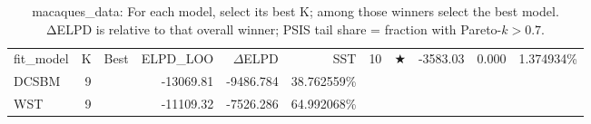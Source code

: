 \begin{table}[!h]
\centering
\caption{macaques_data: For each model, select its best K; among those winners select the best model. ΔELPD is relative to that overall winner; PSIS tail share = fraction with Pareto-\(k>0.7\).\\\label{tab:app-macaques_data-bestK-per-model}}
\centering
\begin{tabular}[t]{lrlrrr}
\toprule
fit_model & K & Best & ELPD\_LOO & $\Delta$ELPD & %
\midrule
SST & 10 & $\bigstar$ & -3583.03 & 0.000 & 1.374934\%\\
DCSBM & 9 &  & -13069.81 & -9486.784 & 38.762559\%\\
WST & 9 &  & -11109.32 & -7526.286 & 64.992068\%\\
\bottomrule
\end{tabular}
\end{table}
